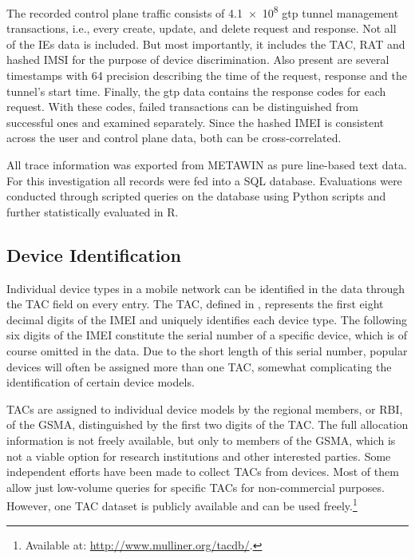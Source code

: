 The recorded control plane traffic consists of \num{4.1e8} \gls{gtp} tunnel management transactions, i.e., every create, update, and delete request and response. Not all of the \glspl{IE} data is included. But most importantly, it includes the \gls{TAC}, \gls{RAT} and hashed \gls{IMSI} for the purpose of device discrimination. Also present are several timestamps with \SI{64}{\bit} precision describing the time of the request, response and the tunnel's start time. Finally, the \gls{gtp} data contains the response codes for each request. With these codes, failed transactions can be distinguished from successful ones and examined separately. Since the hashed \gls{IMEI} is consistent across the user and control plane data, both can be cross-correlated.

All trace information was exported from \gls{METAWIN} as pure line-based text data. For this investigation all records were fed into a \acrshort{SQL} database. Evaluations were conducted through scripted queries on the database using Python scripts and further statistically evaluated in R.

\subsection{Device Identification}

Individual device types in a mobile network can be identified in the data through the \gls{TAC} field on every entry. The \gls{TAC}, defined in \cite{3gpp.23.003}, represents the first eight decimal digits of the \gls{IMEI} and uniquely identifies each device type. The following six digits of the \gls{IMEI} constitute the serial number of a specific device, which is of course omitted in the data. Due to the short length of this serial number, popular devices will often be assigned more than one \gls{TAC}, somewhat complicating the identification of certain device models.

\glspl{TAC} are assigned to individual device models by the regional members, or \gls{RBI}, of the \gls{GSMA}, distinguished by the first two digits of the \gls{TAC}. The full allocation information is not freely available, but only to members of the \gls{GSMA}, which is not a viable option for research institutions and other interested parties. Some independent efforts have been made to collect \glspl{TAC} from devices. Most of them allow just low-volume queries for specific \glspl{TAC} for non-commercial purposes. However, one \gls{TAC} dataset is publicly available and can be used freely.\footnote{Available at: \url{http://www.mulliner.org/tacdb/}.}

